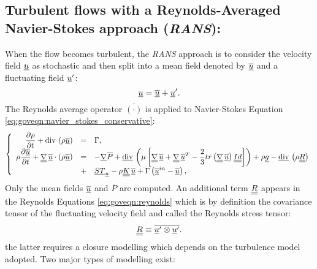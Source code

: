 \subsection{Turbulent flows with a Reynolds-Averaged Navier-Stokes approach (\emph{RANS}):}
When the flow becomes turbulent, the \emph{RANS} approach is to consider the
velocity field $\underline{u}$ as stochastic and then split into a mean field denoted by $\overline{\underline{u}}$ and
a fluctuating field $\underline{u}^\prime$:
\begin{equation}
\underline{u} = \overline{\underline{u}} + \underline{u}^\prime .
\end{equation}
The Reynolds average operator $\overline{\left( \cdot\right)}$ is applied to Navier-Stokes Equation \eqref{eq:goveqn:navier_stokes_conservative}:
%
\begin{equation}\label{eq:goveqn:reynolds}
\left\lbrace
\begin{array}{r c l}
\dfrac{\partial \rho}{\partial t} + \text{div}\, \left( \rho \overline{\underline{u}} \right) &=& \Gamma, \\
\rho \dfrac{\partial  \overline{\underline{u}} }{\partial t}
+
\underline{\underline{{\nabla}}} \, \overline{\underline{u}} \cdot \left( \rho \overline{\underline{u}}\right)
&=& - \underline{\nabla} \overline{P}
+ \underline{\text{div}}\, \left( \mu  \left[ \underline{\underline{{\nabla}}} \, \overline{\underline{u}} + \underline{\underline{{\nabla}}} \, \overline{\underline{u}}^T - \dfrac{2}{3} tr \left(\underline{\underline{{\nabla}}} \, \overline{\underline{u}} \right) \underline{\underline{Id}} \right]   \right)
+ \rho \underline{g}
- \underline{\text{div}}\, \left(\rho \underline{\underline{R}} \right) \\
&+&
\displaystyle
\underline{ST}_{\underline{u}}-\rho\underline{\underline{K}}\,\overline{\underline{u}} + \Gamma \left( \overline{\underline{u}}^{in} - \overline{\underline{u}} \right),
\end{array}
\right.
\end{equation}
%
Only the mean fields $\overline{\underline{u}}$ and $\overline{P}$ are computed.
An additional term $\underline{\underline{R}}$ appears in the Reynolds Equations \eqref{eq:goveqn:reynolds} which is by definition the covariance tensor of the fluctuating
velocity field and called the Reynolds stress tensor:
%
\begin{equation}\label{eq:goveqn:def_reynolds_stress-tensor}
\underline{\underline{R}} \equiv \overline{\underline{u}^\prime \otimes \underline{u}^ \prime}.
\end{equation}
the latter requires a closure modelling which depends on the turbulence model adopted. Two major types of modelling exist:

